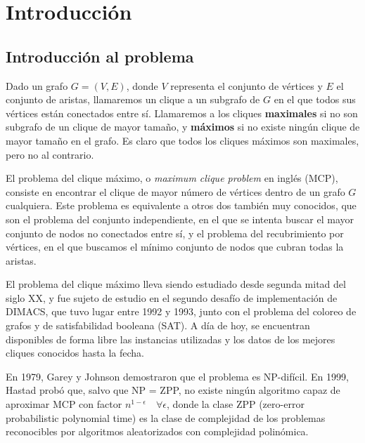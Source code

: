 \chapter{Introducción}\label{ch:introduccionMCP}

\section{Introducción al problema}

Dado un grafo $G = (V, E)$, donde $V$ representa el conjunto de vértices
y $E$ el conjunto de aristas, llamaremos un clique a un subgrafo de $G$
en el que todos sus vértices están conectados entre sí. Llamaremos a los
cliques \textbf{maximales} si no son subgrafo de un clique de mayor tamaño,
y \textbf{máximos} si no existe ningún clique de mayor tamaño en el grafo.
Es claro que todos los cliques máximos son maximales, pero no al contrario.

El problema del clique máximo, o \textit{maximum clique problem} en inglés (MCP),
consiste en encontrar el clique de mayor número de vértices dentro de un
grafo $G$ cualquiera. Este problema es equivalente a otros dos también muy conocidos,
que son el problema del conjunto independiente, en el que se intenta buscar el mayor
conjunto de nodos no conectados entre sí, y el problema del recubrimiento por vértices,
en el que buscamos el mínimo conjunto de nodos que cubran todas la aristas.


El problema del clique máximo lleva siendo estudiado desde segunda mitad del siglo XX, y fue sujeto
de estudio en el segundo desafío de implementación de DIMACS, que tuvo lugar entre 1992
y 1993, junto con el problema del coloreo de grafos y de satisfabilidad booleana (SAT).
A día de hoy, se encuentran disponibles de forma libre las instancias utilizadas y los
datos de los mejores cliques conocidos hasta la fecha.

En 1979, Garey y Johnson \citep{garey:1979} demostraron que el problema es NP-difícil.
En 1999, Hastad \citep{hastad:1999} probó que, salvo que NP = ZPP, no existe ningún
algoritmo capaz de aproximar MCP con factor $n^{1-\epsilon} \quad \forall \epsilon$,
donde la clase ZPP (zero-error probabilistic polynomial time) es la clase de complejidad
de los problemas reconocibles por algoritmos aleatorizados con complejidad polinómica.

